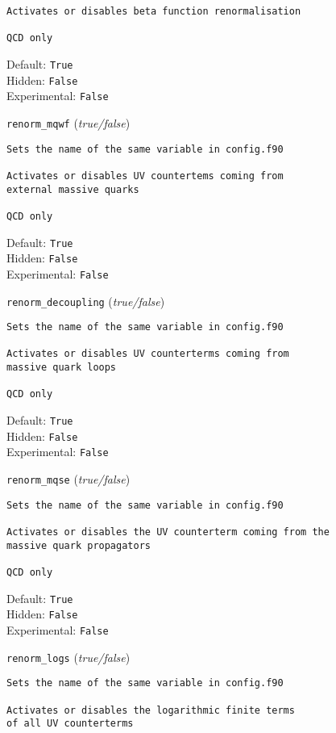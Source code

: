 \begin{basedescript}{\desclabelstyle{\pushlabel}}
\begin{verbatim}
Activates or disables beta function renormalisation

QCD only
\end{verbatim}
Default: \verb|True|
\\Hidden: \verb|False|
\\Experimental: \verb|False|
\\\item[\colorbox{gray!30}{\texttt{renorm\_mqwf}}] (\textit{true/false})
\begin{verbatim}
Sets the name of the same variable in config.f90

Activates or disables UV countertems coming from
external massive quarks

QCD only
\end{verbatim}
Default: \verb|True|
\\Hidden: \verb|False|
\\Experimental: \verb|False|
\\\item[\colorbox{gray!30}{\texttt{renorm\_decoupling}}] (\textit{true/false})
\begin{verbatim}
Sets the name of the same variable in config.f90

Activates or disables UV counterterms coming from
massive quark loops

QCD only
\end{verbatim}
Default: \verb|True|
\\Hidden: \verb|False|
\\Experimental: \verb|False|
\\\item[\colorbox{gray!30}{\texttt{renorm\_mqse}}] (\textit{true/false})
\begin{verbatim}
Sets the name of the same variable in config.f90

Activates or disables the UV counterterm coming from the
massive quark propagators

QCD only
\end{verbatim}
Default: \verb|True|
\\Hidden: \verb|False|
\\Experimental: \verb|False|
\\\item[\colorbox{gray!30}{\texttt{renorm\_logs}}] (\textit{true/false})
\begin{verbatim}
Sets the name of the same variable in config.f90

Activates or disables the logarithmic finite terms
of all UV counterterms


\end{verbatim}
\end{basedescript}
